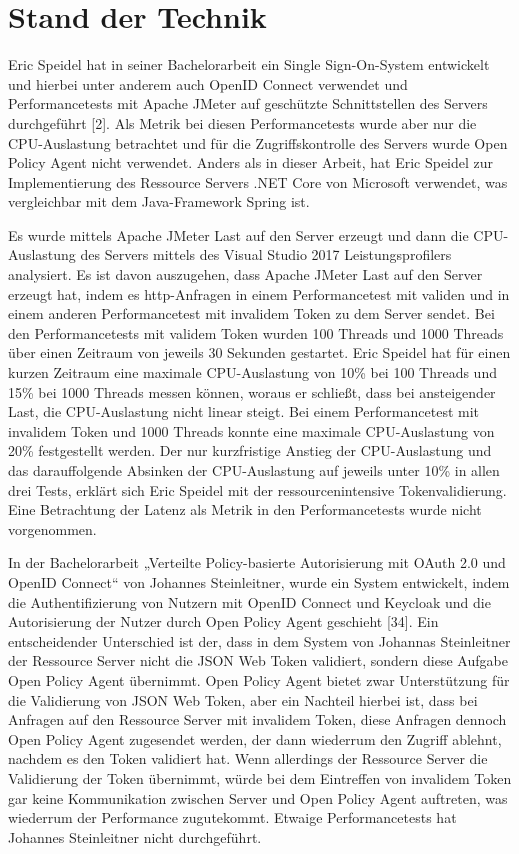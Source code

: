 \chapter{Stand der Technik}
Eric Speidel hat in seiner Bachelorarbeit ein Single Sign-On-System entwickelt und hierbei unter anderem auch OpenID Connect verwendet und Performancetests mit Apache JMeter auf geschützte Schnittstellen des Servers durchgeführt [2]. Als Metrik bei diesen Performancetests wurde aber nur die CPU-Auslastung betrachtet und für die Zugriffskontrolle des Servers wurde Open Policy Agent nicht verwendet. Anders als in dieser Arbeit, hat Eric Speidel zur Implementierung des Ressource Servers .NET Core von Microsoft verwendet, was vergleichbar mit dem Java-Framework Spring ist.\smallskip

Es wurde mittels Apache JMeter Last auf den Server erzeugt und dann die CPU-Auslastung des Servers mittels des Visual Studio 2017 Leistungsprofilers analysiert. Es ist davon auszugehen, dass Apache JMeter Last auf den Server erzeugt hat, indem es http-Anfragen in einem Performancetest mit validen und in einem anderen Performancetest mit invalidem Token zu dem Server sendet. Bei den Performancetests mit validem Token wurden 100 Threads und 1000 Threads über einen Zeitraum von jeweils 30 Sekunden gestartet. Eric Speidel hat für einen kurzen Zeitraum eine maximale CPU-Auslastung von 10\% bei 100 Threads und 15\% bei 1000 Threads messen können, woraus er schließt, dass bei ansteigender Last, die CPU-Auslastung nicht linear steigt. Bei einem Performancetest mit invalidem Token und 1000 Threads konnte eine maximale CPU-Auslastung von 20\% festgestellt werden. Der nur kurzfristige Anstieg der CPU-Auslastung und das darauffolgende Absinken der CPU-Auslastung auf jeweils unter 10\% in allen drei Tests, erklärt sich Eric Speidel mit der ressourcenintensive Tokenvalidierung. Eine Betrachtung der Latenz als Metrik in den Performancetests wurde nicht vorgenommen.\bigskip

In der Bachelorarbeit „Verteilte Policy-basierte Autorisierung mit OAuth 2.0 und OpenID Connect“ von Johannes Steinleitner, wurde ein System entwickelt, indem die Authentifizierung von Nutzern mit OpenID Connect und Keycloak und die Autorisierung der Nutzer durch Open Policy Agent geschieht [34]. Ein entscheidender Unterschied ist der, dass in dem System von Johannas Steinleitner der Ressource Server nicht die JSON Web Token validiert, sondern diese Aufgabe Open Policy Agent übernimmt. Open Policy Agent bietet zwar Unterstützung für die Validierung von JSON Web Token, aber ein Nachteil hierbei ist, dass bei Anfragen auf den Ressource Server mit invalidem Token, diese Anfragen dennoch Open Policy Agent zugesendet werden, der dann wiederrum den Zugriff ablehnt, nachdem es den Token validiert hat. Wenn allerdings der Ressource Server die Validierung der Token übernimmt, würde bei dem Eintreffen von invalidem Token gar keine Kommunikation zwischen Server und Open Policy Agent auftreten, was wiederrum der Performance zugutekommt. Etwaige Performancetests hat Johannes Steinleitner nicht durchgeführt.\bigskip

